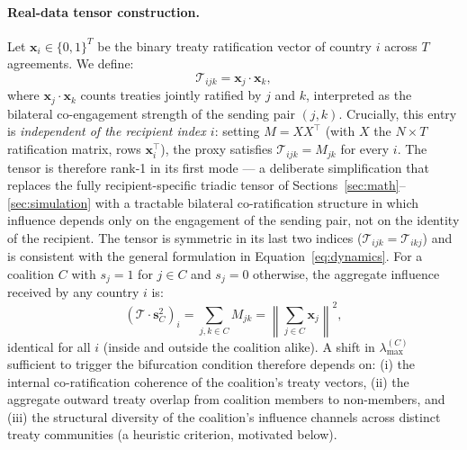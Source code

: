 \documentclass[11pt]{article}
\begin{document}
\paragraph{Real-data tensor construction.}
Let $\mathbf{x}_i \in \{0,1\}^T$ be the binary treaty ratification vector of country $i$ across $T$ agreements. We define:
\begin{equation}
    \mathcal{T}_{ijk} = \mathbf{x}_j \cdot \mathbf{x}_k,
    \label{eq:real_tensor}
\end{equation}
where $\mathbf{x}_j \cdot \mathbf{x}_k$ counts treaties jointly ratified by $j$ and $k$, interpreted as the bilateral co-engagement strength of the sending pair $(j,k)$. Crucially, this entry is \emph{independent of the recipient index $i$}: setting $M = XX^\top$ (with $X$ the $N \times T$ ratification matrix, rows $\mathbf{x}_i^\top$), the proxy satisfies $\mathcal{T}_{ijk} = M_{jk}$ for every $i$. The tensor is therefore rank-1 in its first mode --- a deliberate simplification that replaces the fully recipient-specific triadic tensor of Sections~\ref{sec:math}--\ref{sec:simulation} with a tractable bilateral co-ratification structure in which influence depends only on the engagement of the sending pair, not on the identity of the recipient. The tensor is symmetric in its last two indices ($\mathcal{T}_{ijk} = \mathcal{T}_{ikj}$) and is consistent with the general formulation in Equation~\eqref{eq:dynamics}. For a coalition $C$ with $s_j = 1$ for $j \in C$ and $s_j = 0$ otherwise, the aggregate influence received by any country $i$ is:
\begin{equation}
    \left(\mathcal{T} \cdot \mathbf{s}_C^2\right)_i = \sum_{j,k \in C} M_{jk} = \left\|\sum_{j \in C} \mathbf{x}_j\right\|^2,
\end{equation}
identical for all $i$ (inside and outside the coalition alike). A shift in $\lambda_{\max}^{(C)}$ sufficient to trigger the bifurcation condition therefore depends on: (i) the internal co-ratification coherence of the coalition's treaty vectors, (ii) the aggregate outward treaty overlap from coalition members to non-members, and (iii) the structural diversity of the coalition's influence channels across distinct treaty communities (a heuristic criterion, motivated below).
\end{document}

